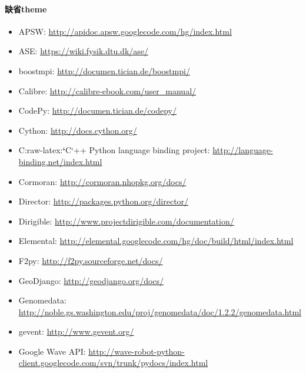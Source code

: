 \documentclass[letterpaper,10pt,english]{sphinxmanual}
\begin{document}
\paragraph{缺省theme}
\label{jupyter/sphinx_quickstart:_u7f3a_u7701theme}\begin{itemize}
\item {} 
APSW: \url{http://apidoc.apsw.googlecode.com/hg/index.html}

\item {} 
ASE: \url{https://wiki.fysik.dtu.dk/ase/}

\item {} 
boostmpi: \url{http://documen.tician.de/boostmpi/}

\item {} 
Calibre: \url{http://calibre-ebook.com/user\_manual/}

\item {} 
CodePy: \url{http://documen.tician.de/codepy/}

\item {} 
Cython: \url{http://docs.cython.org/}

\item {} 
C:raw-latex:{\color{red}\bfseries{}{}`}C{}`++ Python language binding project:
\url{http://language-binding.net/index.html}

\item {} 
Cormoran: \url{http://cormoran.nhopkg.org/docs/}

\item {} 
Director: \url{http://packages.python.org/director/}

\item {} 
Dirigible: \url{http://www.projectdirigible.com/documentation/}

\item {} 
Elemental:
\url{http://elemental.googlecode.com/hg/doc/build/html/index.html}

\item {} 
F2py: \url{http://f2py.sourceforge.net/docs/}

\item {} 
GeoDjango: \url{http://geodjango.org/docs/}

\item {} 
Genomedata:
\url{http://noble.gs.washington.edu/proj/genomedata/doc/1.2.2/genomedata.html}

\item {} 
gevent: \url{http://www.gevent.org/}

\item {} 
Google Wave API:
\url{http://wave-robot-python-client.googlecode.com/svn/trunk/pydocs/index.html}


\end{itemize}
\end{document}
